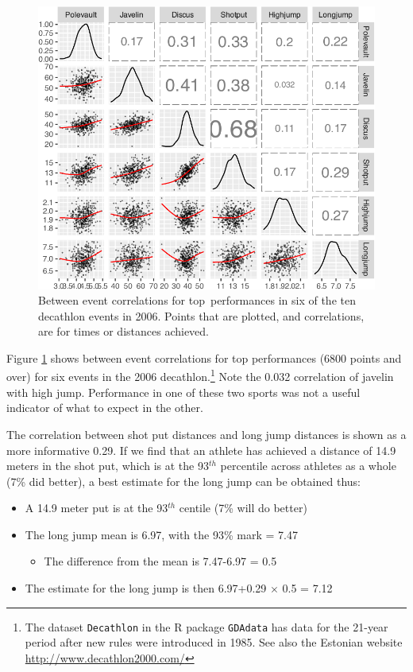 \documentclass[
  10pt,
  b5paper]{book}
\providecommand{\tightlist}{%
  \setlength{\itemsep}{0pt}\setlength{\parskip}{0pt}}
\begin{document}
\begin{figure}[H]

{\centering \includegraphics[width=0.68\linewidth]{07-regress_files/figure-latex/selected-1} 

}

\caption{Between event correlations for top performances in six
of the ten decathlon events in 2006.  Points that are plotted,
and correlations, are for times or distances achieved.}\label{fig:selected}
\end{figure}

Figure \ref{fig:selected} shows between event correlations for top performances (6800 points and over) for six events in the 2006 decathlon.\footnote{The dataset \texttt{Decathlon} in the R package \texttt{GDAdata} has data for the 21-year period after new rules were introduced in 1985. See also the Estonian website \url{http://www.decathlon2000.com/}} Note the 0.032 correlation of javelin with high jump. Performance in one of these two sports was not a useful indicator of what to expect in the other.

The correlation between shot put distances and long jump distances is shown as a more informative 0.29. If we find that an athlete has achieved a distance of 14.9 meters in the shot put, which is at the 93\(^{th}\) percentile across athletes as a whole (7\% did better), a best estimate for the long jump can be obtained thus:

\begin{itemize}
\tightlist
\item
  A 14.9 meter put is at the 93\(^{th}\) centile (7\% will do better)
\item
  The long jump mean is 6.97, with the 93\% mark = 7.47

  \begin{itemize}
  \tightlist
  \item
    The difference from the mean is 7.47-6.97 = 0.5
  \end{itemize}
\item
  The estimate for the long jump is then 6.97+0.29 \(\times\) 0.5 = 7.12
\end{itemize}
\end{document}
